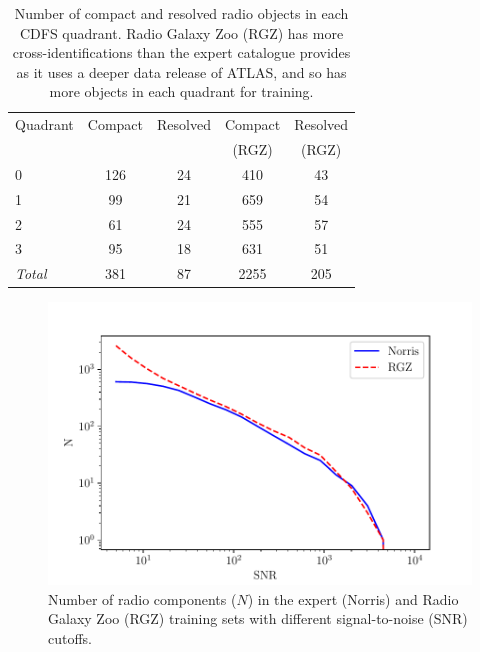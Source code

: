 \documentclass[fleqn,usenatbib,usedcolumn]{mnras}
\begin{document}
    \begin{table}
      \caption{Number of compact and resolved radio objects in each CDFS quadrant. Radio Galaxy Zoo (RGZ) has more cross-identifications than the expert catalogue provides as it uses a deeper data release of ATLAS, and so has more objects in each quadrant for training.}
      \label{tab:radio-count}
      \begin{tabular}{lcccc}
        \hline
        Quadrant & Compact & Resolved & Compact & Resolved\\
        &&&(RGZ)&(RGZ)\\
        \hline
        0 & 126 & 24 & 410 & 43 \\
        1 & 99 & 21 & 659 & 54 \\
        2 & 61 & 24 & 555 & 57 \\
        3 & 95 & 18 & 631 & 51 \\
        \hline
        \textit{Total} & 381 & 87 & 2255 & 205\\
        \hline
      \end{tabular}
    \end{table}

    \begin{figure}
      \centering
      \includegraphics[width=\columnwidth]{images/snr_cutoff_cumulative.pdf}
      \caption{Number of radio components ($N$) in the expert (Norris) and Radio Galaxy
        Zoo (RGZ) training sets with different signal-to-noise (SNR) cutoffs.}
      \label{fig:distribution-cutoffs}
    \end{figure}
\end{document}
